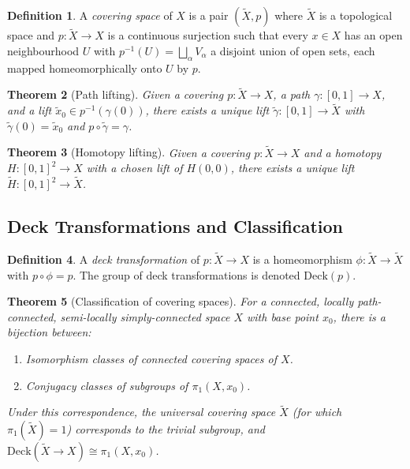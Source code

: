 \documentclass[12pt,a4paper]{amsart}
\newtheorem{theorem}{Theorem}[section]
\theoremstyle{definition}
\newtheorem{definition}[theorem]{Definition}
\begin{document}
\begin{definition}
A \emph{covering space} of $X$ is a pair $(\tilde{X}, p)$ where
$\tilde{X}$ is a topological space and $p\colon \tilde{X} \to X$ is a
continuous surjection such that every $x \in X$ has an open neighbourhood
$U$ with $p^{-1}(U) = \bigsqcup_\alpha V_\alpha$ a disjoint union of open
sets, each mapped homeomorphically onto $U$ by $p$.
\end{definition}

\begin{theorem}[Path lifting]
Given a covering $p\colon \tilde{X} \to X$, a path $\gamma\colon [0,1] \to X$,
and a lift $\tilde{x}_0 \in p^{-1}(\gamma(0))$, there exists a unique lift
$\tilde{\gamma}\colon [0,1] \to \tilde{X}$ with $\tilde{\gamma}(0) = \tilde{x}_0$
and $p \circ \tilde{\gamma} = \gamma$.
\end{theorem}

\begin{theorem}[Homotopy lifting]
Given a covering $p\colon \tilde{X} \to X$ and a homotopy
$H\colon [0,1]^2 \to X$ with a chosen lift of $H(0,0)$, there exists a
unique lift $\tilde{H}\colon [0,1]^2 \to \tilde{X}$.
\end{theorem}

\subsection{Deck Transformations and Classification}

\begin{definition}
A \emph{deck transformation} of $p\colon \tilde{X} \to X$ is a homeomorphism
$\phi\colon \tilde{X} \to \tilde{X}$ with $p \circ \phi = p$.
The group of deck transformations is denoted $\mathrm{Deck}(p)$.
\end{definition}

\begin{theorem}[Classification of covering spaces]
\label{thm:covering_classification}
For a connected, locally path-connected, semi-locally simply-connected space $X$
with base point $x_0$, there is a bijection between:
\begin{enumerate}[label=(\roman*)]
  \item Isomorphism classes of connected covering spaces of $X$.
  \item Conjugacy classes of subgroups of $\pi_1(X, x_0)$.
\end{enumerate}
Under this correspondence, the \emph{universal covering space}
$\tilde{X}$ (for which $\pi_1(\tilde{X}) = 1$) corresponds to the trivial
subgroup, and $\mathrm{Deck}(\tilde{X} \to X) \cong \pi_1(X, x_0)$.
\end{theorem}
\end{document}
